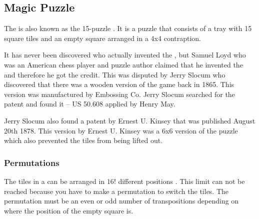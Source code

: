 \subsection{Magic Puzzle}
The \mpuzzle{} is also known as the 15-puzzle \cite[pp. 48-50]{Larsen81}. It is a puzzle that consists of a tray with 15 square tiles and an empty square arranged in a 4x4 contraption.

It has never been discovered who actually invented the \mpuzzle{}, but Samuel Loyd who was an American chess player and puzzle author claimed that he invented the \mpuzzle{} and therefore he got the credit. %
This was disputed by Jerry Slocum who discovered that there was a wooden version of the game back in 1865. This version was manufactured by Embossing Co. Jerry Slocum searched for the patent and found it -- US 50.608 applied by Henry May.

Jerry Slocum also found a patent by Ernest U. Kinsey that was published August 20th 1878. This version by Ernest U. Kinsey was a 6x6 version of the puzzle which also prevented the tiles from being lifted out.

\subsubsection {Permutations}
The tiles in a \mpuzzle{} can be arranged in $16!$ different positions \cite{jaapsch}. This limit can not be reached because you have to make a permutation to switch the tiles. The permutation must be an even or odd number of transpositions depending on where the position of the empty square is.

